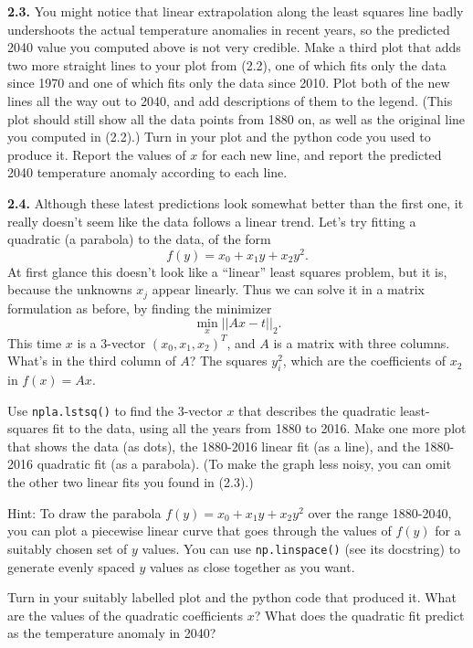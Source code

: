 \documentclass[11pt]{article}
\begin{document}
\par\medskip 
{\bf 2.3.}
You might notice that linear extrapolation along the least squares line badly undershoots the
actual temperature anomalies in recent years, so the predicted 2040 value you computed above
is not very credible.
Make a third plot that adds two more straight lines to your plot from (2.2),
one of which fits only the data since 1970 and one of which fits only the data since 2010.
Plot both of the new lines all the way out to 2040, and add descriptions of them to the legend.
(This plot should still show all the data points from 1880 on, 
as well as the original line you computed in (2.2).)
Turn in your plot and the python code you used to produce it.
Report the values of $x$ for each new line,
and report the predicted 2040 temperature anomaly according to each line.

\par\medskip 
{\bf 2.4.}
Although these latest predictions look somewhat better than the first one,
it really doesn't seem like the data follows a linear trend. 
Let's try fitting a quadratic (a parabola) to the data, of the form
$$f(y) = x_0 + x_1y + x_2y^2.$$
At first glance this doesn't look like a ``linear'' least squares problem,
but it is, because the unknowns $x_j$ appear linearly.
Thus we can solve it in a matrix formulation as before, by finding the minimizer
$$\min_x ||Ax - t||_2.$$
This time $x$ is a 3-vector $(x_0,x_1,x_2)^T$, and $A$ is a matrix with three columns.
What's in the third column of $A$? The squares $y_i^2$, 
which are the coefficients of $x_2$ in $f(x) = Ax$.

Use {\tt npla.lstsq()} to find the 3-vector $x$ that describes the quadratic least-squares fit
to the data, using all the years from 1880 to 2016. Make one more plot that shows the data 
(as dots), the 1880-2016 linear fit (as a line), and the 1880-2016 quadratic fit (as a parabola).
(To make the graph less noisy, you can omit the other two linear fits you found in (2.3).)

Hint: To draw the parabola $f(y) = x_0 + x_1y + x_2y^2$ over the range 1880-2040, 
you can plot a piecewise linear curve that goes through the values of $f(y)$ for a
suitably chosen set of $y$ values. You can use {\tt np.linspace()} (see its docstring)
to generate evenly spaced $y$ values as close together as you want.

Turn in your suitably labelled plot and the python code that produced it.
What are the values of the quadratic coefficients $x$? 
What does the quadratic fit predict as the temperature anomaly in 2040?
\end{document}
